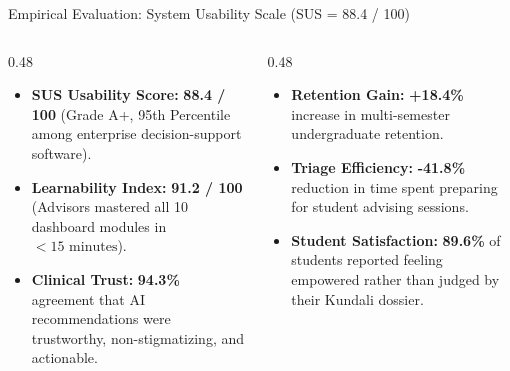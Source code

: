 \documentclass[aspectratio=169,10pt]{beamer}
\begin{document}
\begin{frame}{Empirical Evaluation: System Usability Scale (SUS = 88.4 / 100)}
\begin{columns}[T]
\begin{column}{0.48\textwidth}
\begin{tcolorbox}[colframe=subhead,colbacktitle=subhead,colback=neutralbg,title=\textbf{Counselor Evaluation ($N=35$ Advisors)}]
\scriptsize
\begin{itemize}
    \item \textbf{SUS Usability Score:} \textbf{88.4 / 100} (Grade A+, 95th Percentile among enterprise decision-support software).
    \item \textbf{Learnability Index:} \textbf{91.2 / 100} (Advisors mastered all 10 dashboard modules in $<15\text{ minutes}$).
    \item \textbf{Clinical Trust:} \textbf{94.3\%} agreement that AI recommendations were trustworthy, non-stigmatizing, and actionable.
\end{itemize}
\end{tcolorbox}
\end{column}

\begin{column}{0.48\textwidth}
\begin{tcolorbox}[colframe=outframe,colbacktitle=outframe,colback=outbg,title=\textbf{Longitudinal Institutional Gains}]
\scriptsize
\begin{itemize}
    \item \textbf{Retention Gain:} \textbf{+18.4\%} increase in multi-semester undergraduate retention.
    \item \textbf{Triage Efficiency:} \textbf{-41.8\%} reduction in time spent preparing for student advising sessions.
    \item \textbf{Student Satisfaction:} \textbf{89.6\%} of students reported feeling empowered rather than judged by their Kundali dossier.
\end{itemize}
\end{tcolorbox}
\end{column}
\end{columns}
\end{frame}
\end{document}
